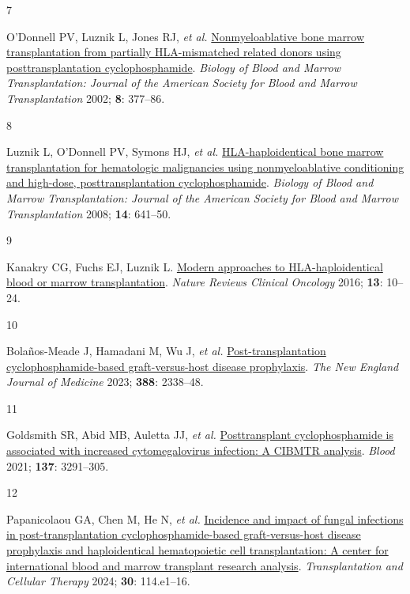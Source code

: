 \documentclass[
  british,
  8.6pt,
  a4paper,
  twocolumn]{article}
\newlength{\cslhangindent}
\newlength{\csllabelwidth}
\newenvironment{CSLReferences}[2] %
 {\begin{list}{}{%
  \setlength{\itemindent}{0pt}
  \setlength{\leftmargin}{0pt}
  \setlength{\parsep}{0pt}
  \ifodd #1
   \setlength{\leftmargin}{\cslhangindent}
   \setlength{\itemindent}{-1\cslhangindent}
  \fi
  \setlength{\itemsep}{#2\baselineskip}}}
 {\end{list}}
\newcommand{\CSLLeftMargin}[1]{\parbox[t]{\csllabelwidth}{\strut#1\strut}}
\newcommand{\CSLRightInline}[1]{\parbox[t]{\linewidth - \csllabelwidth}{\strut#1\strut}}
\begin{document}
\begin{CSLReferences}{0}{1}
\CSLLeftMargin{7 }%
\CSLRightInline{O'Donnell PV, Luznik L, Jones RJ, \emph{et al.}
\href{https://doi.org/10.1053/bbmt.2002.v8.pm12171484}{Nonmyeloablative
bone marrow transplantation from partially HLA-mismatched related donors
using posttransplantation cyclophosphamide}. \emph{Biology of Blood and
Marrow Transplantation: Journal of the American Society for Blood and
Marrow Transplantation} 2002; \textbf{8}: 377--86.}

\CSLLeftMargin{8 }%
\CSLRightInline{Luznik L, O'Donnell PV, Symons HJ, \emph{et al.}
\href{https://doi.org/10.1016/j.bbmt.2008.03.005}{HLA-haploidentical
bone marrow transplantation for hematologic malignancies using
nonmyeloablative conditioning and high-dose, posttransplantation
cyclophosphamide}. \emph{Biology of Blood and Marrow Transplantation:
Journal of the American Society for Blood and Marrow Transplantation}
2008; \textbf{14}: 641--50.}

\CSLLeftMargin{9 }%
\CSLRightInline{Kanakry CG, Fuchs EJ, Luznik L.
\href{https://doi.org/10.1038/nrclinonc.2015.128}{Modern approaches to
HLA-haploidentical blood or marrow transplantation}. \emph{Nature
Reviews Clinical Oncology} 2016; \textbf{13}: 10--24.}

\CSLLeftMargin{10 }%
\CSLRightInline{Bolaños-Meade J, Hamadani M, Wu J, \emph{et al.}
\href{https://doi.org/10.1056/NEJMoa2215943}{Post-transplantation
cyclophosphamide-based graft-versus-host disease prophylaxis}. \emph{The
New England Journal of Medicine} 2023; \textbf{388}: 2338--48.}

\CSLLeftMargin{11 }%
\CSLRightInline{Goldsmith SR, Abid MB, Auletta JJ, \emph{et al.}
\href{https://doi.org/10.1182/blood.2020009362}{Posttransplant
cyclophosphamide is associated with increased cytomegalovirus infection:
A CIBMTR analysis}. \emph{Blood} 2021; \textbf{137}: 3291--305.}

\CSLLeftMargin{12 }%
\CSLRightInline{Papanicolaou GA, Chen M, He N, \emph{et al.}
\href{https://doi.org/10.1016/j.jtct.2023.09.017}{Incidence and impact
of fungal infections in post-transplantation cyclophosphamide-based
graft-versus-host disease prophylaxis and haploidentical hematopoietic
cell transplantation: A center for international blood and marrow
transplant research analysis}. \emph{Transplantation and Cellular
Therapy} 2024; \textbf{30}: 114.e1--16.}

\end{CSLReferences}
\end{document}
